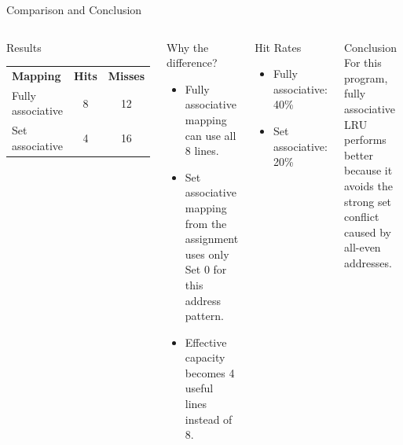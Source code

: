 \documentclass[aspectratio=169]{beamer}
\begin{document}
\begin{frame}{Comparison and Conclusion}
\begin{columns}[T]
\begin{block}{Results}
\begin{tabular}{lcc}
\textbf{Mapping} & \textbf{Hits} & \textbf{Misses} \\
Fully associative & 8 & 12 \\
Set associative & 4 & 16
\end{tabular}
\end{block}

\begin{block}{Why the difference?}
\begin{itemize}
    \item Fully associative mapping can use all 8 lines.
    \item Set associative mapping from the assignment uses only Set 0 for this address pattern.
    \item Effective capacity becomes 4 useful lines instead of 8.
\end{itemize}
\end{block}

\begin{block}{Hit Rates}
\begin{itemize}
    \item Fully associative: 40\%
    \item Set associative: 20\%
\end{itemize}
\end{block}

\begin{alertblock}{Conclusion}
For this program, fully associative LRU performs better because it avoids the strong set conflict caused by all-even addresses.
\end{alertblock}
\end{columns}
\end{frame}
\end{document}
